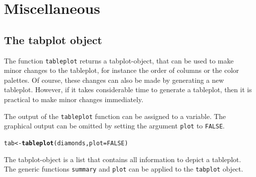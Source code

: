 \documentclass[11pt, fleqn, a4paper]{article}\usepackage{graphicx, color}
\makeatletter
\newcommand{\hlfunctioncall}[1]{\textcolor[rgb]{0.501960784313725,0,0.329411764705882}{\textbf{#1}}}%
\newenvironment{kframe}{%
 \def\at@end@of@kframe{}%
 \ifinner\ifhmode%
  \def\at@end@of@kframe{\end{minipage}}%
  \begin{minipage}{\columnwidth}%
 \fi\fi%
 \def\FrameCommand##1{\hskip\@totalleftmargin \hskip-\fboxsep
 \colorbox{shadecolor}{##1}\hskip-\fboxsep
     \hskip-\linewidth \hskip-\@totalleftmargin \hskip\columnwidth}%
 \MakeFramed {\advance\hsize-\width
   \@totalleftmargin\z@ \linewidth\hsize
   \@setminipage}}%
 {\par\unskip\endMakeFramed%
 \at@end@of@kframe}
\newenvironment{knitrout}{}{} %
\makeatother
\begin{document}
\section{Miscellaneous}

\subsection{The tabplot object}\label{sectab}

The function {\tt tableplot} returns a tabplot-object, that can be used to make minor changes to the tableplot, for instance the order of columns or the color palettes. Of course, these changes can also be made by generating a new tableplot. However, if it takes considerable time to generate a tableplot, then it is practical to make minor changes immediately.

The output of the {\tt tableplot} function can be assigned to a variable. The graphical output can be omitted by setting the argument {\tt plot} to {\tt FALSE}.

\begin{knitrout}
\color{fgcolor}\begin{kframe}
\begin{alltt}
tab <- \hlfunctioncall{tableplot}(diamonds, plot = FALSE)
\end{alltt}
\end{kframe}
\end{knitrout}


The tabplot-object is a list that contains all information to depict a tableplot. The generic functions {\tt summary} and {\tt plot} can be applied to the {\tt tabplot} object.
\end{document}
